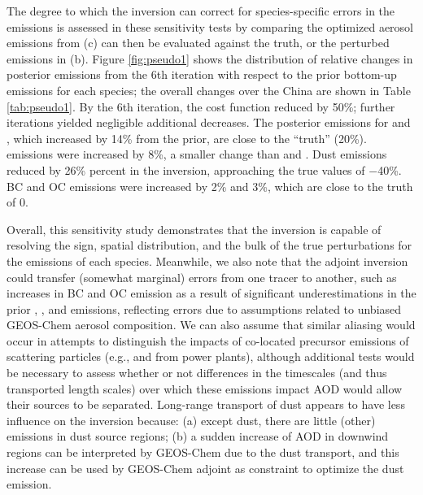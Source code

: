  The degree to which the inversion can correct for species-specific errors in the emissions 
 is assessed in these sensitivity tests by comparing the optimized aerosol emissions 
 from (c) can then be evaluated against the truth, or the perturbed emissions in (b).  
 Figure \ref{fig:pseudo1} shows the distribution of relative changes in posterior emissions 
 from the 6th iteration with respect to the prior bottom-up emissions for each species; 
 the overall changes over the China are shown in Table \ref{tab:pseudo1}.
 By the 6th iteration, the cost function reduced by 50\%; 
 further iterations yielded negligible additional decreases. 
 The posterior emissions for  and , which increased by 14\% from the prior, 
 are close to the “truth” (20\%).  emissions were increased by 8\%, 
 a smaller change than  and . 
 Dust emissions reduced by 26\% percent in the inversion, 
 approaching the true values of $-$40\%.
 BC and OC emissions were increased by 2\% and 3\%, which are close to the truth of 0. 

 Overall, this sensitivity study demonstrates that the inversion is capable of resolving the sign,
 spatial distribution, and the bulk of the true perturbations for the emissions of each species.
 Meanwhile, we also note that the adjoint inversion could transfer (somewhat marginal) errors
 from one tracer to another, such as increases in BC and OC emission 
 as a result of significant underestimations in the prior , , and  emissions,
 reflecting errors due to assumptions related to unbiased GEOS-Chem aerosol composition.
 We can also assume that similar aliasing would occur in attempts 
 to distinguish the impacts of co-located precursor emissions of scattering particles
 (e.g.,  and  from power plants),
 although additional tests would be necessary to assess whether or not differences 
 in the timescales (and thus transported length scales) 
 over which these emissions impact AOD would allow their sources to be separated.
 Long-range transport of dust appears to have less influence on the inversion because:
 (a) except dust, there are little (other) emissions in dust source regions;
 (b) a sudden increase of AOD in downwind regions can be interpreted by GEOS-Chem
 due to the dust transport, and this increase can be used by GEOS-Chem adjoint
  as constraint to optimize the dust emission.

